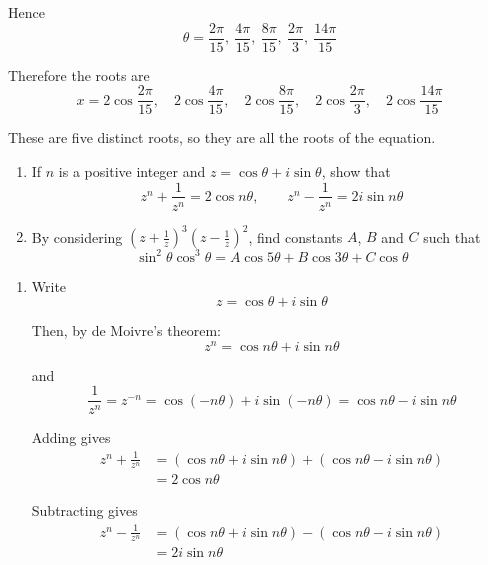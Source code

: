 \documentclass[leqno]{article}
\begin{document}
\begin{enumerate}[
  label=\textbf{\arabic*.},
  leftmargin=*,
  topsep=0pt,
  partopsep=0pt,
  parsep=0pt
]
\begin{djsSolution}
\begin{enumerate}[label=\textbf{(\alph*)}]
Hence
\[
\theta=\frac{2\pi}{15},\ \frac{4\pi}{15},\ \frac{8\pi}{15},\ \frac{2\pi}{3},\ \frac{14\pi}{15}
\]

Therefore the roots are
\[
x=2\cos\frac{2\pi}{15},\quad
2\cos\frac{4\pi}{15},\quad
2\cos\frac{8\pi}{15},\quad
2\cos\frac{2\pi}{3},\quad
2\cos\frac{14\pi}{15}
\]

These are five distinct roots, so they are all the roots of the equation.
\end{enumerate}
\end{djsSolution}


\newpage

\questionitem

\begin{enumerate}[label=\textbf{(\alph*)}]
  \item If $n$ is a positive integer and $z = \cos\theta + i\sin\theta$, show that
  \[
  z^n + \frac{1}{z^n} = 2\cos n\theta,
  \qquad
  z^n - \frac{1}{z^n} = 2i\sin n\theta
  \]
  \item By considering $\left(z+\frac{1}{z}\right)^3\left(z-\frac{1}{z}\right)^2$, find constants $A$, $B$ and $C$ such that
  \[
  \sin^2\theta\cos^3\theta = A\cos 5\theta + B\cos 3\theta + C\cos\theta
  \]
\end{enumerate}

\vspace*{10pt}

\begin{djsSolution}
\begin{enumerate}[label=\textbf{(\alph*)}]
  \item Write
\[
z=\cos\theta+i\sin\theta
\]

Then, by de Moivre's theorem:
\[
z^n=\cos n\theta+i\sin n\theta
\]

and
\[
\frac{1}{z^n}=z^{-n}=\cos(-n\theta)+i\sin(-n\theta)=\cos n\theta-i\sin n\theta
\]

Adding gives
\begin{align*}
z^n+\frac{1}{z^n}
&=(\cos n\theta+i\sin n\theta)+(\cos n\theta-i\sin n\theta)\\
&=2\cos n\theta
\end{align*}

Subtracting gives
\begin{align*}
z^n-\frac{1}{z^n}
&=(\cos n\theta+i\sin n\theta)-(\cos n\theta-i\sin n\theta)\\
&=2i\sin n\theta
\end{align*}


\end{enumerate}
\end{djsSolution}
\end{enumerate}
\end{document}
